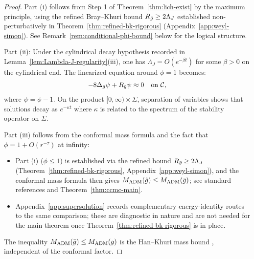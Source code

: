 \begin{proof}
Part (i) follows from Step 1 of Theorem~\ref{thm:lich-exist} by the maximum principle, using the refined Bray--Khuri bound $R_{\bar{g}}\geq 2\Lambda_J$ established non-perturbatively in Theorem~\ref{thm:refined-bk-rigorous} (Appendix~\ref{app:weyl-simon}). See Remark~\ref{rem:conditional-phi-bound} below for the logical structure.

Part (ii): Under the cylindrical decay hypothesis recorded in Lemma~\ref{lem:Lambda-J-regularity}(iii), one has $\Lambda_J = O(e^{-\beta t})$ for some $\beta > 0$ on the cylindrical end. The linearized equation around $\phi = 1$ becomes:
\[
-8\Delta_{\bar{g}}\psi + R_{\bar{g}}\psi \approx 0 \quad \text{on } \mathcal{C},
\]
where $\psi = \phi - 1$. On the product $[0,\infty) \times \Sigma$, separation of variables shows that solutions decay as $e^{-\kappa t}$ where $\kappa$ is related to the spectrum of the stability operator on $\Sigma$.

Part (iii) follows from the conformal mass formula and the fact that $\phi = 1 + O(r^{-\tau})$ at infinity:
\begin{itemize}
\item Part (i) ($\phi \leq 1$) is established via the refined bound $R_{\bar{g}}\geq 2\Lambda_J$ (Theorem~\ref{thm:refined-bk-rigorous}, Appendix~\ref{app:weyl-simon}), and the conformal mass formula then gives $M_{\mathrm{ADM}}(\tilde{g}) \leq M_{\mathrm{ADM}}(\bar{g})$; see standard references \cite{bartnik1986} and Theorem~\ref{thm:ccmc-main}.
\item Appendix~\ref{app:supersolution} records complementary energy-identity routes to the same comparison; these are diagnostic in nature and are not needed for the main theorem once Theorem~\ref{thm:refined-bk-rigorous} is in place.
\end{itemize}
The inequality $M_{\mathrm{ADM}}(\bar{g}) \leq M_{\mathrm{ADM}}(g)$ is the Han--Khuri mass bound \cite{hankhuri2013}, independent of the conformal factor.
\end{proof}

